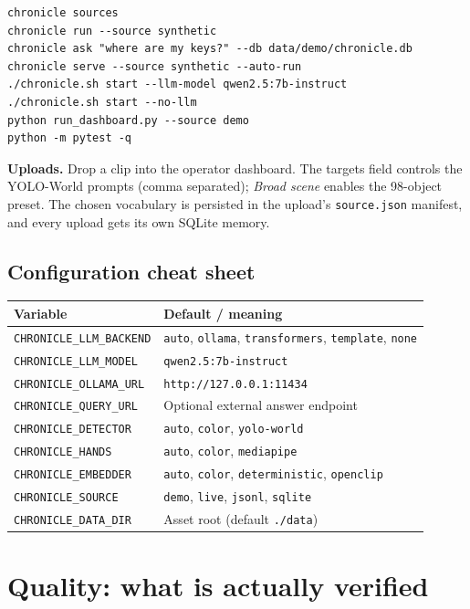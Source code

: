 \documentclass[10pt,a4paper]{article}
\newcommand{\code}[1]{\texttt{\small #1}}
\begin{document}
\begin{verbatim}
chronicle sources
chronicle run --source synthetic
chronicle ask "where are my keys?" --db data/demo/chronicle.db
chronicle serve --source synthetic --auto-run
./chronicle.sh start --llm-model qwen2.5:7b-instruct
./chronicle.sh start --no-llm
python run_dashboard.py --source demo
python -m pytest -q
\end{verbatim}

\textbf{Uploads.} Drop a clip into the operator dashboard. The targets field controls the
YOLO-World prompts (comma separated); \emph{Broad scene} enables the 98-object preset. The
chosen vocabulary is persisted in the upload's \code{source.json} manifest, and every upload gets
its own SQLite memory.

\subsection{Configuration cheat sheet}

\begin{center}
\small
\begin{tabularx}{\linewidth}{@{}lX@{}}
\toprule
\textbf{Variable} & \textbf{Default / meaning} \\
\midrule
\code{CHRONICLE\_LLM\_BACKEND} & \code{auto}, \code{ollama}, \code{transformers}, \code{template}, \code{none} \\
\code{CHRONICLE\_LLM\_MODEL} & \code{qwen2.5:7b-instruct} \\
\code{CHRONICLE\_OLLAMA\_URL} & \code{http://127.0.0.1:11434} \\
\code{CHRONICLE\_QUERY\_URL} & Optional external answer endpoint \\
\code{CHRONICLE\_DETECTOR} & \code{auto}, \code{color}, \code{yolo-world} \\
\code{CHRONICLE\_HANDS} & \code{auto}, \code{color}, \code{mediapipe} \\
\code{CHRONICLE\_EMBEDDER} & \code{auto}, \code{color}, \code{deterministic}, \code{openclip} \\
\code{CHRONICLE\_SOURCE} & \code{demo}, \code{live}, \code{jsonl}, \code{sqlite} \\
\code{CHRONICLE\_DATA\_DIR} & Asset root (default \code{./data}) \\
\bottomrule
\end{tabularx}
\end{center}

\section{Quality: what is actually verified}
\end{document}
